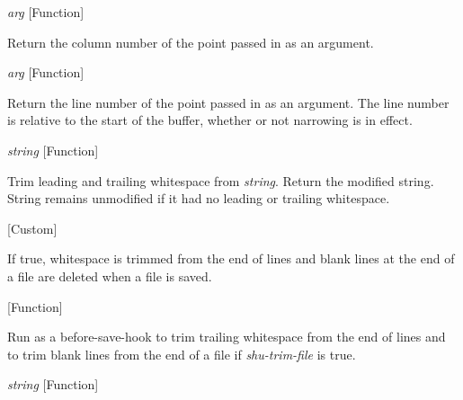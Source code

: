 \vspace{1em}
\noindent
{}
\usebox{\funcname}\emph{arg}
 \hfill [Function]

\begin{doc-string}
Return the column number of the point passed in as an argument.
\end{doc-string}

\vspace{1em}
\noindent
{}
\usebox{\funcname}\emph{arg}
 \hfill [Function]

\begin{doc-string}
Return the line number of the point passed in as an argument.  The line number is
relative to the start of the buffer, whether or not narrowing is in effect.
\end{doc-string}

\vspace{1em}
\noindent
{}
\usebox{\funcname}\emph{string}
 \hfill [Function]

\begin{doc-string}
Trim leading and trailing whitespace from \emph{string}.  Return the modified
string.  String remains unmodified if it had no leading or trailing whitespace.
\end{doc-string}

\vspace{1em}
\noindent
{}
\usebox{\funcname}
 \hfill [Custom]

\begin{doc-string}
If true, whitespace is trimmed from the end of lines and blank lines at the
end of a file are deleted when a file is saved.
\end{doc-string}

\vspace{1em}
\noindent
{}
\usebox{\funcname}
 \hfill [Function]

\begin{doc-string}
Run as a before-save-hook to trim trailing whitespace from the end of lines and
to trim blank lines from the end of a file if \emph{shu-trim-file} is true.
\end{doc-string}

\vspace{1em}
\noindent
{}
\usebox{\funcname}\emph{string}
 \hfill [Function]

